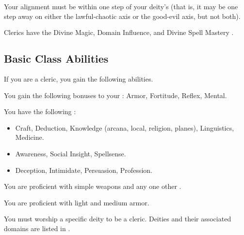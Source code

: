      Your alignment must be within one step of your deity's (that is, it may be one step away on either the lawful-chaotic axis or the good-evil axis, but not both).

     Clerics have the Divine Magic, Domain Influence, and Divine Spell Mastery .

    \subsection{Basic Class Abilities}
        If you are a cleric, you gain the following abilities.

        You gain the following bonuses to your :  Armor,  Fortitude,  Reflex,  Mental.

        You have the following :
        \begin{itemize}
            \item {} Craft, Deduction, Knowledge (arcana, local, religion, planes), Linguistics, Medicine.
            \item {} Awareness, Social Insight, Spellsense.
            \item {} Deception, Intimidate, Persuasion, Profession.
        \end{itemize}

        You are proficient with simple weapons and any one other .

        You are proficient with light and medium armor.

        You must worship a specific deity to be a cleric.
        Deities and their associated domains are listed in .


